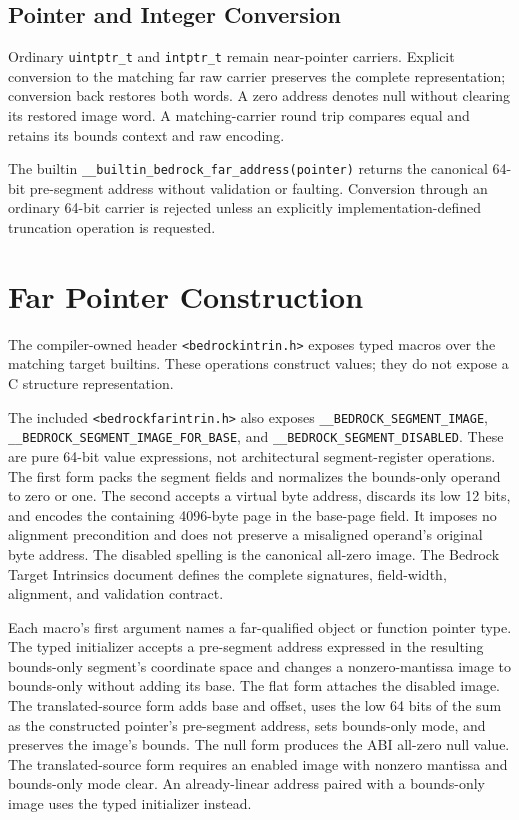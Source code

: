 \documentclass[10pt,twoside]{article}
\begin{document}
\subsection{Pointer and Integer Conversion}
Ordinary \texttt{uintptr\_t} and \texttt{intptr\_t} remain near-pointer
carriers. Explicit conversion to the matching far raw carrier preserves the
complete representation; conversion back restores both words. A zero address
denotes null without clearing its restored image word. A matching-carrier round
trip compares equal and retains its bounds context and raw encoding.

The builtin \texttt{\_\_builtin\_bedrock\_far\_address(pointer)} returns the
canonical 64-bit pre-segment address without validation or faulting.
Conversion through an ordinary 64-bit carrier is rejected unless an explicitly
implementation-defined truncation operation is requested.

\section{Far Pointer Construction}\label{page:far-pointer-construction}
The compiler-owned header \texttt{<bedrockintrin.h>} exposes typed macros over
the matching target builtins. These operations construct values; they do not
expose a C structure representation.

The included \texttt{<bedrockfarintrin.h>} also exposes
\texttt{\_\_BEDROCK\_SEGMENT\_IMAGE},
\texttt{\_\_BEDROCK\_SEGMENT\_IMAGE\_FOR\_BASE}, and
\texttt{\_\_BEDROCK\_SEGMENT\_DISABLED}. These are pure 64-bit value
expressions, not architectural segment-register operations. The first form
packs the segment fields and normalizes the bounds-only operand to zero or one.
The second accepts a virtual byte address, discards its low 12 bits, and encodes
the containing 4096-byte page in the base-page field. It imposes no alignment
precondition and does not preserve a misaligned operand's original byte
address. The disabled spelling is the canonical all-zero image.
The Bedrock Target Intrinsics document defines the complete signatures,
field-width, alignment, and validation contract.

Each macro's first argument names a far-qualified object or function pointer
type. The typed initializer accepts a pre-segment address expressed in the
resulting bounds-only segment's coordinate space and changes a nonzero-mantissa
image to bounds-only without adding its base. The flat form attaches the
disabled image. The translated-source form adds base and offset, uses the low
64 bits of the sum as the constructed pointer's pre-segment address, sets
bounds-only mode, and preserves the image's bounds. The null form produces the
ABI all-zero null value.
The translated-source form requires an enabled image with nonzero mantissa and
bounds-only mode clear. An already-linear address paired with a bounds-only
image uses the typed initializer instead.
\end{document}
